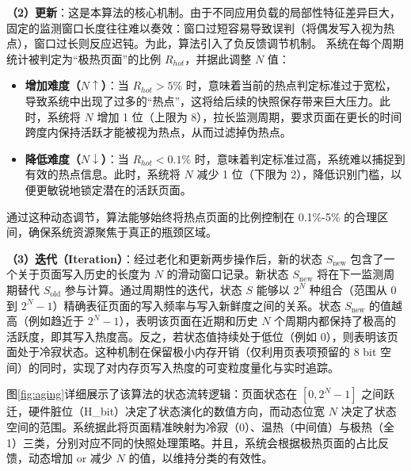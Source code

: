 \textbf{（2）更新}：这是本算法的核心机制。由于不同应用负载的局部性特征差异巨大，固定的监测窗口长度往往难以奏效：窗口过短容易导致误判（将偶发写入视为热点），窗口过长则反应迟钝。为此，算法引入了负反馈调节机制。
系统在每个周期统计被判定为“极热页面”的比例 $R_{hot}$，并据此调整 $N$ 值：
\begin{itemize}
\item \textbf{增加难度（$N \uparrow$）}：当 $R_{hot} > 5\%$ 时，意味着当前的热点判定标准过于宽松，导致系统中出现了过多的“热点”，这将给后续的快照保存带来巨大压力。此时，系统将 $N$ 增加 1 位（上限为 8），拉长监测周期，要求页面在更长的时间跨度内保持活跃才能被视为热点，从而过滤掉伪热点。
\item \textbf{降低难度（$N \downarrow$）}：当 $R_{hot} < 0.1\%$ 时，意味着判定标准过高，系统难以捕捉到有效的热点信息。此时，系统将 $N$ 减少 1 位（下限为 2），降低识别门槛，以便更敏锐地锁定潜在的活跃页面。
\end{itemize}
通过这种动态调节，算法能够始终将热点页面的比例控制在 0.1\%-5\% 的合理区间，确保系统资源聚焦于真正的瓶颈区域。

\textbf{（3）迭代（Iteration）}：经过老化和更新两步操作后，新的状态 $S_{\mathrm{new}}$ 包含了一个关于页面写入历史的长度为 $N$ 的滑动窗口记录。新状态 $S_{\mathrm{new}}$ 将在下一监测周期替代 $S_{\mathrm{old}}$ 参与计算。通过周期性的迭代，状态 $S$ 能够以 $2^N$ 种组合（范围从 $0$ 到 $2^N-1$）精确表征页面的写入频率与写入新鲜度之间的关系。状态 $S_{\mathrm{new}}$ 的值越高（例如趋近于 $2^N-1$），表明该页面在近期和历史 $N$ 个周期内都保持了极高的活跃度，即其写入热度高。反之，若状态值持续处于低位（例如 $0$），则表明该页面处于冷寂状态。这种机制在保留极小内存开销（仅利用页表项预留的 8 bit 空间）的同时，实现了对内存页写入热度的可变粒度量化与实时追踪。

图\ref{fig:aging}详细展示了该算法的状态流转逻辑：页面状态在 $[0, 2^N-1]$ 之间跃迁，硬件脏位（H\_bit）决定了状态演化的数值方向，而动态位宽 $N$ 决定了状态空间的范围。系统据此将页面精准映射为冷寂（0）、温热（中间值）与极热（全 1）三类，分别对应不同的快照处理策略。并且，系统会根据极热页面的占比反馈，动态增加 or 减少 $N$ 的值，以维持分类的有效性。

